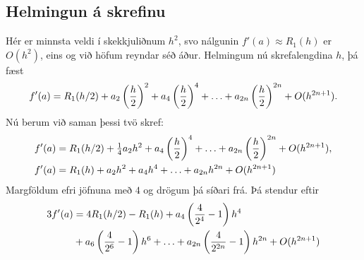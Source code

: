 \documentclass[letterpaper,10pt,icelandic]{sphinxmanual}
\begin{document}
\subsection{Helmingun á skrefinu}
\label{kafli04:helmingun-a-skrefinu}
Hér er minnsta veldi í skekkjuliðnum \(h^2\), svo nálgunin
\(f'(a)
\approx R_1(h)\) er \(O(h^2)\), eins og við höfum reyndar séð áður.
Helmingum nú skrefalengdina \(h\), þá fæst
\begin{gather}
\begin{split}f'(a) = R_1(h/2) + a_2 \left(\frac{h}{2}\right)^2
  + a_4 \left(\frac{h}{2}\right)^4 + \ldots
  + a_{2n} \left(\frac{h}{2}\right)^{2n} + O(h^{2n+1}).\end{split}\notag
\end{gather}
Nú berum við saman þessi tvö skref:
\begin{gather}
\begin{split}\begin{aligned}
  f'(a) &= R_1(h/2) + \tfrac 14 a_2 h^2
  + a_4 \left(\frac{h}{2}\right)^4 + \ldots
  + a_{2n} \left(\frac{h}{2}\right)^{2n} + O(h^{2n+1}),\\
  f'(a) &= R_1(h)
  + a_2 h^2 + a_4 h^4 + \ldots + a_{2n} h^{2n} + O(h^{2n+1})\\\end{aligned}\end{split}\notag
\end{gather}
Margföldum efri jöfnuna með \(4\) og drögum þá síðari frá. Þá
stendur eftir
\begin{gather}
\begin{split}\begin{aligned}
  3f'(a) &= 4 R_1(h/2) - R_1(h)
  + a_4 \left( \frac{4}{2^4} - 1 \right)h^4 \\
  &+ a_6 \left( \frac{4}{2^6} - 1 \right)h^6
  + \ldots
  + a_{2n} \left( \frac{4}{2^{2n}} - 1 \right)h^{2n}
  + O(h^{2n+1})\end{aligned}\end{split}\notag
\end{gather}
\end{document}
